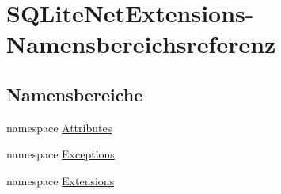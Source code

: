 \hypertarget{namespace_s_q_lite_net_extensions}{}\section{S\+Q\+Lite\+Net\+Extensions-\/\+Namensbereichsreferenz}
\label{namespace_s_q_lite_net_extensions}
\subsection*{Namensbereiche}
\begin{DoxyCompactItemize}
\item 
namespace \mbox{\hyperlink{namespace_s_q_lite_net_extensions_1_1_attributes}{Attributes}}
\item 
namespace \mbox{\hyperlink{namespace_s_q_lite_net_extensions_1_1_exceptions}{Exceptions}}
\item 
namespace \mbox{\hyperlink{namespace_s_q_lite_net_extensions_1_1_extensions}{Extensions}}
\end{DoxyCompactItemize}
